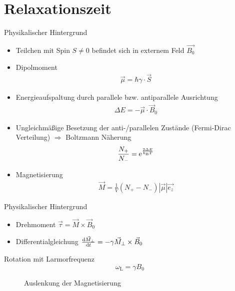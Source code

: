 
\thispagestyle{empty}
\frame{\titlepage}


\section{Relaxationszeit}
\begin{frame}{Physikalischer Hintergrund}
	\begin{itemize}
	\item Teilchen mit Spin $S\neq 0$ befindet sich in externem Feld $\vec{B_{0}}$
	\item Dipolmoment
		\begin{align*}
		\vec{\mu}=\hbar\gamma\cdot\vec{S}
		\end{align*}
	\item Energieaufspaltung durch parallele bzw. antiparallele Ausrichtung
		\begin{align*}
		\Delta E = -\vec{\mu}\cdot\vec{B}_0
		\end{align*}
	\item Ungleichmäßige Besetzung der anti-/parallelen Zustände (Fermi-Dirac Verteilung)
		$\Rightarrow$ Boltzmann Näherung
		\begin{align*}
		\frac{N_+}{N_-}=\mathrm{e}^{\frac{2\Delta E}{k_{\text{B}} T}}
		\end{align*}
	 \item Magnetisierung 
		\begin{align*}
		\vec{M}=\frac{1}{V}(N_+-N_-)|\vec{\mu}|\vec{e_{z}}
		\end{align*}
	\end{itemize}
\end{frame}

\begin{frame}{Physikalischer Hintergrund}
	\begin{itemize}
	\item Drehmoment $\vec{\tau}=\vec{M}\times\vec{B}_0$
	\item Differentialgleichung $\dv{\vec{M}_\bot}{t}=-\gamma\vec{M}_\bot\times\vec{B}_0$
	\end{itemize}
	\begin{block}{Rotation mit Larmorfrequenz}
		\[
		\omega_\text{L}=\gamma B_0
		\]
	\end{block}
	\begin{figure}
	
	\caption{Auslenkung der Magnetisierung}
	\end{figure}
\end{frame}

